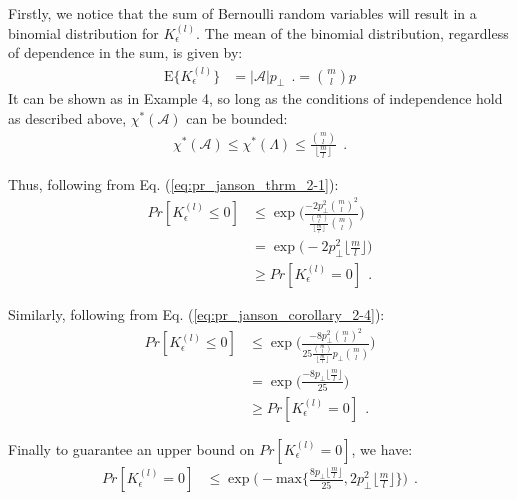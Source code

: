 Firstly, we notice that the sum of Bernoulli random variables will result in a binomial distribution for $K_\epsilon^{(l)}$. The mean of the binomial distribution, regardless of dependence in the sum, is given by:
\begin{equation}\label{eq:binom_mean}
    \begin{aligned}
        \text{E}\lbrace K_\epsilon^{(l)} \rbrace &= \vert \mathscr{A} \vert p_\perp \ \ .
        =\binom{m}{l}p
    \end{aligned}
\end{equation}
It can be shown as in \cite{Janson2004} Example 4, so long as the conditions of independence hold as described above, $\chi^*(\mathscr{A})$ can be bounded:
\begin{equation}\label{eq:chi_bound}
    \begin{aligned}
        \chi^*(\mathscr{A})\leq\chi^*(\Lambda)\leq \frac{ \binom{m}{l}}{\lfloor \frac{m}{l} \rfloor} \ \ .
    \end{aligned}
\end{equation}

Thus, following from Eq. (\ref{eq:pr_janson_thrm_2-1}):
\begin{equation}\label{eq:pr_thrm_2-1}
    \begin{aligned}
        Pr[K_\epsilon^{(l)} \leq 0] &\leq \exp\bigg(\frac{-2p_\perp^2\binom{m}{l}^2}{\frac{\binom{m}{l}}{\lfloor \frac{m}{l}\rfloor}\binom{m}{l}}\bigg)\\
        &= \exp\bigg( -2p_\perp^2 \lfloor \frac{m}{l} \rfloor \bigg)\\
        &\geq Pr[K_\epsilon^{(l)} = 0] \ \ .
    \end{aligned}
\end{equation}

Similarly, following from Eq. (\ref{eq:pr_janson_corollary_2-4}):
\begin{equation}\label{eq:pr_corollary_2-4}
    \begin{aligned}
        Pr[K_\epsilon^{(l)} \leq 0] &\leq \exp\bigg(\frac{-8p_\perp^2\binom{m}{l}^2}{25\frac{\binom{m}{l}}{\lfloor \frac{m}{l} \rfloor} p_\perp \binom{m}{l}} \bigg)\\
        &= \exp\bigg(\frac{-8p_\perp \lfloor \frac{m}{l} \rfloor}{25} \bigg)\\
        &\geq Pr[K_\epsilon^{(l)} = 0] \ \ .
    \end{aligned}
\end{equation}

Finally to guarantee an upper bound on $ Pr[K_\epsilon^{(l)} = 0]$, we have:
\begin{equation}\label{eq:pr_K_ub}
    \begin{aligned}
        Pr[K_\epsilon^{(l)} = 0]&\leq \exp\bigg(-\text{max}\bigg\lbrace \frac{8p_\perp \lfloor \frac{m}{l} \rfloor}{25}, 2p_\perp^2 \lfloor \frac{m}{l} \rfloor\bigg\rbrace \bigg) \ \ .
    \end{aligned}
\end{equation}

